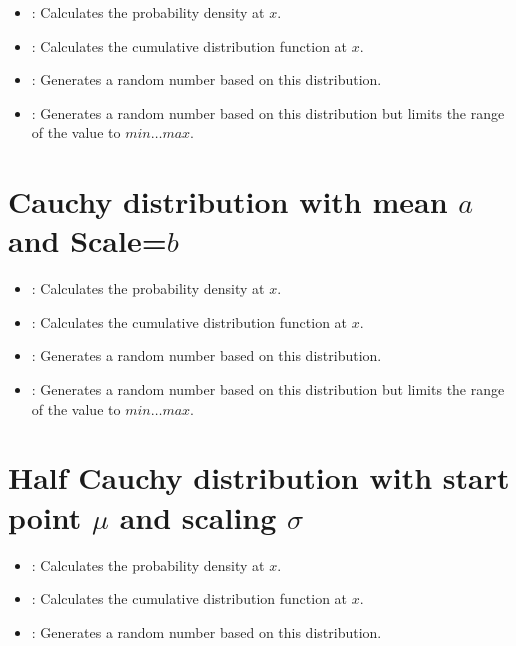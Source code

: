 \begin{itemize}

\item
{}:
Calculates the probability density at $x$.

\item
{}:
Calculates the cumulative distribution function at $x$.

\item
{}:
Generates a random number based on this distribution.

\item
{}:
Generates a random number based on this distribution but limits the range of the value to $min\ldots max$.

\end{itemize}



\section{Cauchy distribution with mean \texorpdfstring{$a$}{a} and Scale=\texorpdfstring{$b$}{b}}

\begin{itemize}

\item
{}:
Calculates the probability density at $x$.

\item
{}:
Calculates the cumulative distribution function at $x$.

\item
{}:
Generates a random number based on this distribution.

\item
{}:
Generates a random number based on this distribution but limits the range of the value to $min\ldots max$.

\end{itemize}



\section{Half Cauchy distribution with start point \texorpdfstring{$\mu$}{mu} and scaling \texorpdfstring{$\sigma$}{sigma}}

\begin{itemize}

\item
{}:
Calculates the probability density at $x$.

\item
{}:
Calculates the cumulative distribution function at $x$.

\item
{}:
Generates a random number based on this distribution.

\end{itemize}



